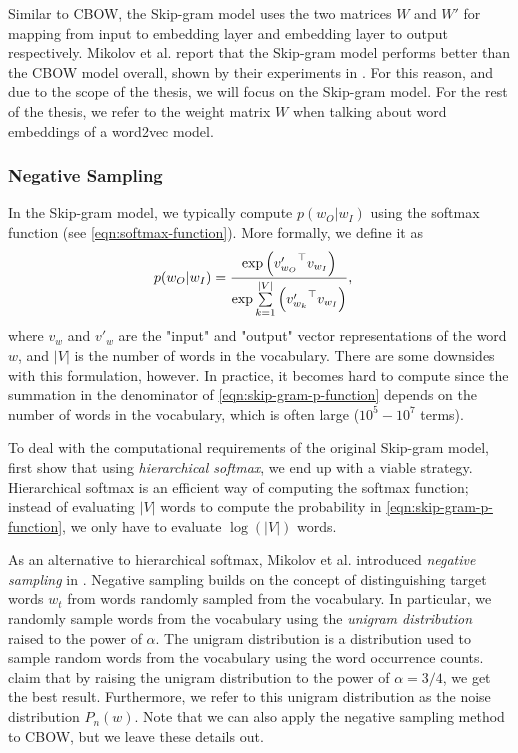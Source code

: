 Similar to CBOW, the Skip-gram model uses the two matrices $W$ and $W'$ for mapping from input to embedding layer and embedding layer to output respectively. Mikolov et al. report that the Skip-gram model performs better than the CBOW model overall, shown by their experiments in \cites{mikolov2013a}. For this reason, and due to the scope of the thesis, we will focus on the Skip-gram model. For the rest of the thesis, we refer to the weight matrix $W$ when talking about word embeddings of a word2vec model.

\subsubsection{Negative Sampling}
In the Skip-gram model, we typically compute $p(w_O | w_I)$ using the softmax function (see \cref{eqn:softmax-function}). More formally, we define it as
\begin{align}
    p(w_O | w_I)
    &= \frac{\exp{ \left( {v'_{w_O}}^\top v_{w_I} \right) }} {\exp{ \sum\limits_{k=1}^{|V|} \left( {v'_{w_k}}^\top v_{w_I} \right) }},
    \label{eqn:skip-gram-p-function}
\end{align}
where $v_w$ and $v'_w$ are the "input" and "output" vector representations of the word $w$, and $|V|$ is the number of words in the vocabulary. There are some downsides with this formulation, however. In practice, it becomes hard to compute since the summation in the denominator of \cref{eqn:skip-gram-p-function} depends on the number of words in the vocabulary, which is often large ($10^5 - 10^7$ terms).

To deal with the computational requirements of the original Skip-gram model, \cite{mikolov2013b} first show that using \textit{hierarchical softmax}, we end up with a viable strategy. Hierarchical softmax is an efficient way of computing the softmax function; instead of evaluating $|V|$ words to compute the probability in \cref{eqn:skip-gram-p-function}, we only have to evaluate $\log \left( |V| \right)$ words.

As an alternative to hierarchical softmax, Mikolov et al. introduced \textit{negative sampling} in \cite{mikolov2013b}. Negative sampling builds on the concept of distinguishing target words $w_t$ from words randomly sampled from the vocabulary. In particular, we randomly sample words from the vocabulary using the \textit{unigram distribution} raised to the power of $\alpha$. The unigram distribution is a distribution used to sample random words from the vocabulary using the word occurrence counts. \cite{mikolov2013b} claim that by raising the unigram distribution to the power of $\alpha = 3/4$, we get the best result. Furthermore, we refer to this unigram distribution as the noise distribution $P_n(w)$. Note that we can also apply the negative sampling method to CBOW, but we leave these details out.

